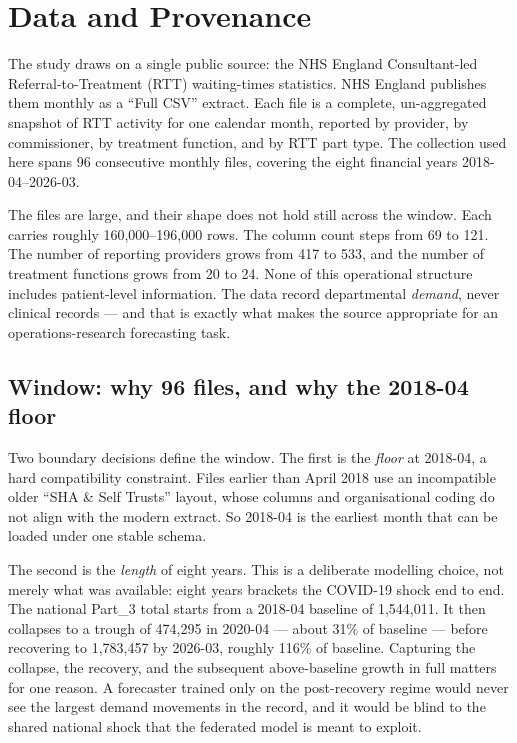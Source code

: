 \documentclass[11pt,a4paper]{article}
\begin{document}
\section{Data and Provenance}\label{sec:data}

The study draws on a single public source: the NHS England Consultant-led
Referral-to-Treatment (RTT) waiting-times statistics. NHS England publishes
them monthly as a ``Full CSV'' extract. Each file is a complete,
un-aggregated snapshot of RTT activity for one calendar month, reported by
provider, by commissioner, by treatment function, and by RTT part type. The
collection used here spans 96 consecutive monthly files, covering the eight
financial years 2018-04--2026-03.

The files are large, and their shape does not hold still across the window.
Each carries roughly 160,000--196,000 rows. The column count steps from 69 to
121. The number of reporting providers grows from 417 to 533, and the number
of treatment functions grows from 20 to 24. None of this operational structure
includes patient-level information. The data record departmental \emph{demand},
never clinical records --- and that is exactly what makes the source
appropriate for an operations-research forecasting task.

\subsection{Window: why 96 files, and why the 2018-04 floor}

Two boundary decisions define the window. The first is the \emph{floor} at
2018-04, a hard compatibility constraint. Files earlier than April 2018 use an
incompatible older ``SHA \& Self Trusts'' layout, whose columns and
organisational coding do not align with the modern extract. So 2018-04 is the
earliest month that can be loaded under one stable schema.

The second is the \emph{length} of eight years. This is a deliberate modelling
choice, not merely what was available: eight years brackets the COVID-19 shock
end to end. The national Part\_3 total starts from a 2018-04 baseline of
1,544,011. It then collapses to a trough of 474,295 in 2020-04 --- about
31\% of baseline --- before recovering to 1,783,457 by 2026-03, roughly
116\% of baseline. Capturing the collapse, the recovery, and the subsequent
above-baseline growth in full matters for one reason. A forecaster trained only
on the post-recovery regime would never see the largest demand movements in the
record, and it would be blind to the shared national shock that the federated
model is meant to exploit.
\end{document}
